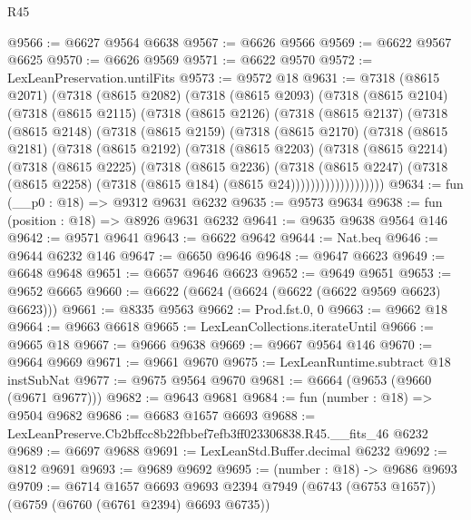 \begin{lexlean}{R45}
\begin{coremodule}
{@9566 := @6627 @9564 @6638
@9567 := @6626 @9566
@9569 := @6622 @9567 @6625
@9570 := @6626 @9569
@9571 := @6622 @9570
@9572 := LexLeanPreservation.untilFits
@9573 := @9572 @18
@9631 := @7318
    (@8615 @2071)
    (@7318
      (@8615 @2082)
      (@7318
        (@8615 @2093)
        (@7318
          (@8615 @2104)
          (@7318
            (@8615 @2115)
            (@7318
              (@8615 @2126)
              (@7318
                (@8615 @2137)
                (@7318
                  (@8615 @2148)
                  (@7318
                    (@8615 @2159)
                    (@7318
                      (@8615 @2170)
                      (@7318
                        (@8615 @2181)
                        (@7318
                          (@8615 @2192)
                          (@7318
                            (@8615 @2203)
                            (@7318
                              (@8615 @2214)
                              (@7318
                                (@8615 @2225)
                                (@7318
                                  (@8615 @2236)
                                  (@7318
                                    (@8615 @2247)
                                    (@7318
                                      (@8615 @2258)
                                      (@7318 (@8615 @184) (@8615 @24)))))))))))))))))))
@9634 := fun (__p0 : @18) => @9312 @9631 @6232
@9635 := @9573 @9634
@9638 := fun (position : @18) => @8926 @9631 @6232
@9641 := @9635 @9638 @9564 @146
@9642 := @9571 @9641
@9643 := @6622 @9642
@9644 := Nat.beq
@9646 := @9644 @6232 @146
@9647 := @6650 @9646
@9648 := @9647 @6623
@9649 := @6648 @9648
@9651 := @6657 @9646 @6623
@9652 := @9649 @9651
@9653 := @9652 @6665
@9660 := @6622 (@6624 (@6624 (@6622 (@6622 @9569 @6623) @6623)))
@9661 := @8335 @9563
@9662 := Prod.fst.{0, 0}
@9663 := @9662 @18
@9664 := @9663 @6618
@9665 := LexLeanCollections.iterateUntil
@9666 := @9665 @18
@9667 := @9666 @9638
@9669 := @9667 @9564 @146
@9670 := @9664 @9669
@9671 := @9661 @9670
@9675 := LexLeanRuntime.subtract @18 instSubNat
@9677 := @9675 @9564 @9670
@9681 := @6664 (@9653 (@9660 (@9671 @9677)))
@9682 := @9643 @9681
@9684 := fun (number : @18) => @9504 @9682
@9686 := @6683 @1657 @6693
@9688 := LexLeanPreserve.Cb2bffcc8b22fbbef7efb3ff023306838.R45.__fits_46 @6232
@9689 := @6697 @9688
@9691 := LexLeanStd.Buffer.decimal @6232
@9692 := @812 @9691
@9693 := @9689 @9692
@9695 := (number : @18) -> @9686 @9693
@9709 := @6714
    @1657
    @6693
    @9693
    @2394
    @7949
    (@6743 (@6753 @1657))
    (@6759 (@6760 (@6761 @2394) @6693 @6735))
}
\end{coremodule}
\end{lexlean}
